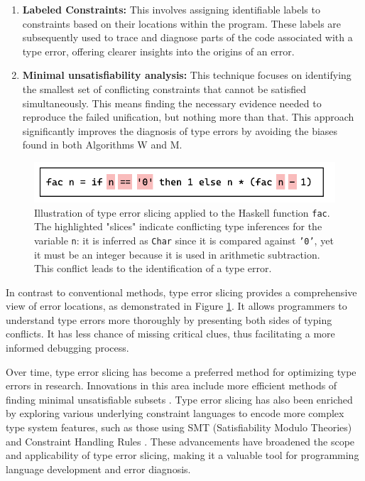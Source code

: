\begin{enumerate}
  \item {
    \textbf{Labeled Constraints:}
    This involves assigning identifiable labels to constraints based on their locations within the program. These labels are subsequently used to trace and diagnose parts of the code associated with a type error, offering clearer insights into the origins of an error.
  }
  \item {
    \textbf{Minimal unsatisfiability analysis:} 
    This technique focuses on identifying the smallest set of conflicting constraints that cannot be satisfied simultaneously. This means finding the necessary evidence needed to reproduce the failed unification, but nothing more than that. This approach significantly improves the diagnosis of type errors by avoiding the biases found in both Algorithms W and M.
  }
\end{enumerate}


\begin{figure}[hbt]
  \includegraphics[width=0.8\linewidth]{TypeErrorSlicing.pdf}
  \caption[Illustration of type error slicing applied to the Haskell function \texttt{fac}]{
    \label{fig:type-error-slicing}
    Illustration of type error slicing applied to the Haskell function \texttt{fac}. The highlighted "slices" indicate conflicting type inferences for the variable \texttt{n}: it is inferred as \texttt{Char} since it is compared against \texttt{'0'}, yet it must be an integer because it is used in arithmetic subtraction. This conflict leads to the identification of a type error.}
\end{figure}

In contrast to conventional methods, type error slicing provides a comprehensive view of error locations, as demonstrated in Figure \ref{fig:type-error-slicing}. It allows programmers to understand type errors more thoroughly by presenting both sides of typing conflicts. It has less chance of missing critical clues, thus facilitating a more informed debugging process.

Over time, type error slicing has become a preferred method for optimizing type errors in research. Innovations in this area include more efficient methods of finding minimal unsatisfiable subsets \cite{Liffiton2008-mx, Bailey2005-hi, Bacchus2015-of}. Type error slicing has also been enriched by exploring various underlying constraint languages to encode more complex type system features, such as those using SMT (Satisfiability Modulo Theories) \cite{Pavlinovic2015-ke} and Constraint Handling Rules \cite{Stuckey2003-pz}. These advancements have broadened the scope and applicability of type error slicing, making it a valuable tool for programming language development and error diagnosis.


